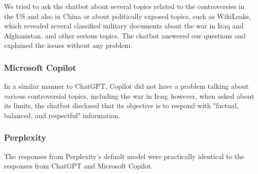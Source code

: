 We tried to ask the chatbot about several topics related to the controversies in the US and also in China or about politically exposed topics, such as WikiLeaks, which revealed several classified military documents about the war in Iraq and Afghanistan, and other serious topics. The chatbot answered our questions and explained the issues without any problem.

\subsubsection*{Microsoft Copilot}

In a similar manner to ChatGPT, Copilot did not have a problem talking about various controversial topics, including the war in Iraq; however, when asked about its limits, the chatbot disclosed that its objective is to respond with "factual, balanced, and respectful" information.

\subsubsection*{Perplexity}

The responses from Perplexity's defualt model were practically identical to the responses from ChatGPT and Microsoft Copilot.






